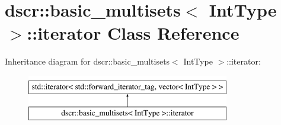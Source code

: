 \hypertarget{classdscr_1_1basic__multisets_1_1iterator}{\section{dscr\-:\-:basic\-\_\-multisets$<$ Int\-Type $>$\-:\-:iterator Class Reference}
\label{classdscr_1_1basic__multisets_1_1iterator}
}
Inheritance diagram for dscr\-:\-:basic\-\_\-multisets$<$ Int\-Type $>$\-:\-:iterator\-:\begin{figure}[H]
\begin{center}
\leavevmode
\includegraphics[height=2.000000cm]{classdscr_1_1basic__multisets_1_1iterator}
\end{center}
\end{figure}
